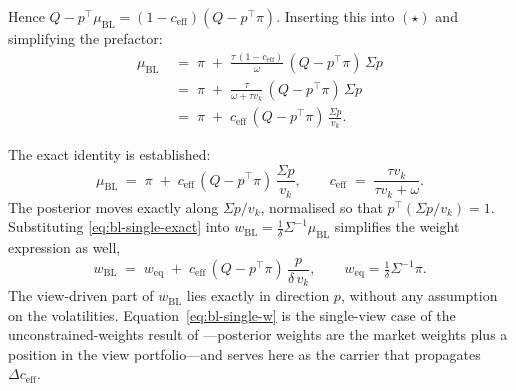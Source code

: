 \documentclass[a4paper,11pt]{article}
\theoremstyle{plain}
\theoremstyle{definition}
\newcommand{\muBL}{\mu_{\mathrm{BL}}}
\newcommand{\eff}{\mathrm{eff}}
\begin{document}
Hence $Q - p^\top\muBL = (1-c_{\eff})(Q - p^\top\pi)$. Inserting this
into $(\star)$ and simplifying the prefactor:
\begin{align*}
  \muBL \;&=\; \pi \;+\; \tfrac{\tau\,(1 - c_{\eff})}{\omega}\,(Q - p^\top\pi)\,\Sigma p\\
  \;&=\; \pi \;+\; \tfrac{\tau}{\omega + \tau v_k}\,(Q - p^\top\pi)\,\Sigma p\\
  \;&=\; \pi \;+\; c_{\eff}\,(Q - p^\top\pi)\,\tfrac{\Sigma p}{v_k}.
\end{align*}

The exact identity is established:
\begin{equation}
\label{eq:bl-single-exact}
  \muBL \;=\; \pi \;+\; c_{\eff}\,(Q - p^\top\pi)\,\frac{\Sigma p}{v_k},
  \qquad c_{\eff} \;=\; \frac{\tau v_k}{\tau v_k + \omega}.
\end{equation}
The posterior moves exactly along $\Sigma p / v_k$, normalised so that
$p^\top(\Sigma p / v_k) = 1$. Substituting \eqref{eq:bl-single-exact}
into $w_{\mathrm{BL}} = \tfrac{1}{\delta}\Sigma^{-1}\muBL$ simplifies
the weight expression as well,
\begin{equation}
\label{eq:bl-single-w}
  w_{\mathrm{BL}} \;=\; w_{\mathrm{eq}} \;+\; c_{\eff}\,(Q - p^\top\pi)\,\frac{p}{\delta\,v_k},
  \qquad w_{\mathrm{eq}} = \tfrac{1}{\delta}\Sigma^{-1}\pi.
\end{equation}
The view-driven part of $w_{\mathrm{BL}}$ lies exactly in direction
$p$, without any assumption on the volatilities.
Equation~\eqref{eq:bl-single-w} is the single-view case of the
unconstrained-weights result of \citet{HeLitterman1999}---posterior
weights are the market weights plus a position in the view
portfolio---and serves here as the carrier that propagates
$\Delta c_{\eff}$.
\end{document}
